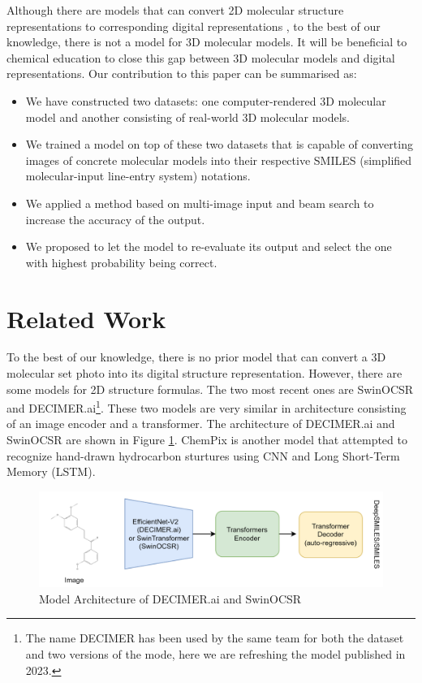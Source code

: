 \documentclass[12pt]{article}
\begin{document}
Although there are models that can convert 2D molecular structure representations to corresponding digital representations \autocite{swinocsr}\autocite{decimer}\autocite{chempix}, to the best of our knowledge, there is not a model for 3D molecular models. It will be beneficial to chemical education to close this gap between 3D molecular models and digital representations. 
Our contribution to this paper can be summarised as:
\begin{itemize}
\item We have constructed two datasets: one computer-rendered 3D molecular model and another consisting of real-world 3D molecular models.
\item We trained a model on top of these two datasets that is capable of converting images of concrete molecular models into their respective SMILES (simplified molecular-input line-entry system) notations. 
\item We applied a method based on multi-image input and beam search to increase the accuracy of the output.
\item  We proposed to let the model to re-evaluate its output and select the one with highest probability being correct.
\end{itemize}

\section{Related Work}
To the best of our knowledge, there is no prior model that can convert a 3D molecular set photo into its digital structure representation. However, there are some models for 2D structure formulas. The two most recent ones are SwinOCSR\autocite{swinocsr} and DECIMER.ai\footnote{The name DECIMER has been used by the same team for both the dataset and two versions of the mode, here we are refreshing the model published in 2023.}\autocite{decimer}. These two models are very similar in architecture consisting of an image encoder and a transformer. The architecture of DECIMER.ai and SwinOCSR are shown in Figure \ref{fig:rwa}.
ChemPix is another model that attempted to recognize hand-drawn hydrocarbon sturtures using CNN and Long Short-Term Memory (LSTM).  

\begin{figure}
    \centering
    \includegraphics[width=\textwidth]{related_work_arch.png}
    \caption{Model Architecture of DECIMER.ai and SwinOCSR}
    \label{fig:rwa}
\end{figure}
\end{document}
